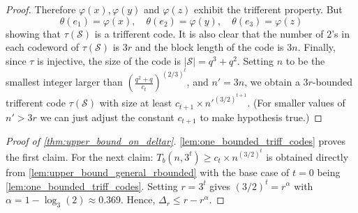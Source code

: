 \documentclass[10pt,a4paper]{article}
\DeclareMathOperator{\1}{\mathbf{1}}
\begin{document}
\begin{proof}
Therefore $\varphi(x), \varphi(y)$ and $\varphi(z)$ exhibit the trifferent property.
	But
\begin{equation*}
		\theta(e_1) = \varphi(x), \quad \theta(e_2) = \varphi(y), \quad \theta(e_3) = \varphi(z)
	\end{equation*}
	showing that $\tau(\mathcal{S})$ is a trifferent code.
	It is also clear that the number of $2$'s in each codeword of $\tau(\mathcal{S})$ is $3r$ and the block length of the code is $3n$.
	Finally, since $\tau$ is injective, the size of the code is $|\mathcal S| = q^3 + q^2$.
Setting $n$ to be the smallest integer larger than $\left(\frac{q^2+q}{c_t}\right)^{(2/3)^t}$, and $n'=3n$, we obtain a $3r$-bounded trifferent code $\tau(\mathcal{S})$ with size at least $c_{t+1}\times n'^{(3/2)^{t+1}}$. (For smaller values of $n'>3r$ we can just adjust the constant $c_{t+1}$ to make hypothesis true.)
\end{proof}

\begin{proof}[Proof of \cref{thm:upper_bound_on_deltar}]
\cref{lem:one_bounded_triff_codes} proves the first claim.
    For the next claim: $T_b(n,3^t)\geq c_t\times n^{(3/2)^t}$ is obtained directly from \cref{lem:upper_bound_general_rbounded} with the base case of $t=0$ being \cref{lem:one_bounded_triff_codes}. Setting $r=3^t$ gives $(3/2)^t = r^\alpha$ with $\alpha = 1- \log_3(2)\approx0.369$. Hence, $\Delta_r\leq r - r^\alpha$.
\end{proof}


























































































\end{document}
